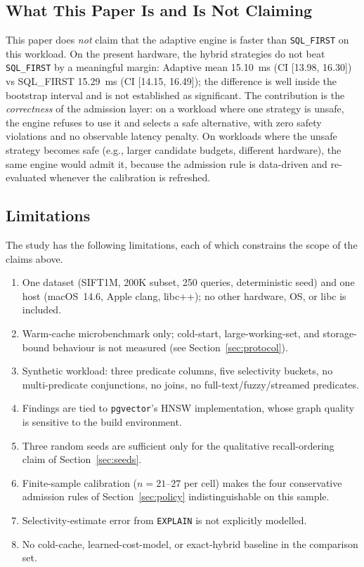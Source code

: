 \documentclass[conference]{IEEEtran}
\begin{document}
\subsection{What This Paper Is and Is Not Claiming}
\label{sec:claims}

This paper does \emph{not} claim that the adaptive engine is faster than
\texttt{SQL\_FIRST} on this workload. On the present hardware, the
hybrid strategies do not beat \texttt{SQL\_FIRST} by a meaningful margin:
Adaptive mean 15.10~ms (CI [13.98, 16.30]) vs SQL\_FIRST 15.29~ms (CI
[14.15, 16.49]); the difference is well inside the bootstrap interval
and is not established as significant. The contribution is the
\emph{correctness} of the admission layer: on a workload where one
strategy is unsafe, the engine refuses to use it and selects a safe
alternative, with zero safety violations and no observable latency
penalty. On workloads where the unsafe strategy becomes safe (e.g.,
larger candidate budgets, different hardware), the same engine would
admit it, because the admission rule is data-driven and re-evaluated
whenever the calibration is refreshed.

\subsection{Limitations}
\label{sec:limitations}

The study has the following limitations, each of which constrains the
scope of the claims above.
\begin{enumerate}
\item One dataset (SIFT1M, 200K subset, 250 queries, deterministic seed) and
one host (macOS~14.6, Apple clang, libc++); no other hardware, OS, or libc
is included.
\item Warm-cache microbenchmark only; cold-start, large-working-set, and
storage-bound behaviour is not measured (see Section~\ref{sec:protocol}).
\item Synthetic workload: three predicate columns, five selectivity
buckets, no multi-predicate conjunctions, no joins, no
full-text/fuzzy/streamed predicates.
\item Findings are tied to \texttt{pgvector}'s HNSW implementation, whose
graph quality is sensitive to the build environment.
\item Three random seeds are sufficient only for the qualitative
recall-ordering claim of Section~\ref{sec:seeds}.
\item Finite-sample calibration ($n = 21$--$27$ per cell) makes the four
conservative admission rules of Section~\ref{sec:policy} indistinguishable
on this sample.
\item Selectivity-estimate error from \texttt{EXPLAIN} is not explicitly
modelled.
\item No cold-cache, learned-cost-model, or exact-hybrid baseline in the
comparison set.
\end{enumerate}
\end{document}
